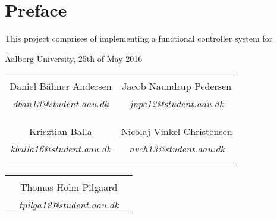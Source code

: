 \chapter*{Preface}

This project comprises of implementing a functional controller system for 

\begin{flushright}
Aalborg University, 25th of May 2016
\end{flushright}





\vfill

\begin{table}[H]
	\centering
		\begin{tabular}{c c }
			\underline{\phantom{mmmmmmmmmmmmmmmmmmm}}       & \underline{\phantom{mmmmmmmmmmmmmmmmmmm}} \\
			Daniel Bähner Andersen			 & Jacob Naundrup Pedersen  \\
			\textit{dban13@student.aau.dk} & \textit{jnpe12@student.aau.dk}\\
			&\\
			&\\
			\underline{\phantom{mmmmmmmmmmmmmmmmmmm}}       & \underline{\phantom{mmmmmmmmmmmmmmmmmmm}} \\
			Krisztian Balla			 & Nicolaj Vinkel Christensen \\
			\textit{kballa16@student.aau.dk} & \textit{nvch13@student.aau.dk} \\
			&\\
			&\\	
		\end{tabular}
		\begin{tabular}{c c c}
			& \underline{\phantom{mmmmmmmmmmmmmmmmmmm}} 	& \\
			& Thomas Holm Pilgaard 					& \\
			& \textit{tpilga12@student.aau.dk}		& \\
		\end{tabular}
\end{table}